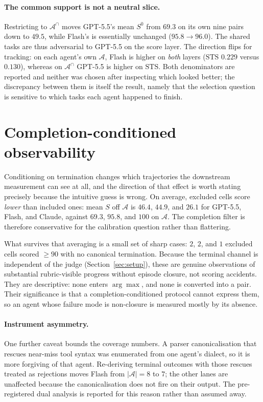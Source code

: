 \documentclass{article}
\newcommand{\A}{\mathcal{A}}
\newcommand{\Acap}{\mathcal{A}^{\cap}}
\newcommand{\STS}{\mathrm{STS}}
\begin{document}
\paragraph{The common support is not a neutral slice.}
Restricting to $\Acap$ moves GPT-5.5's mean $S^{0}$ from $69.3$ on its own nine pairs down to $49.5$, while Flash's is essentially unchanged ($95.8\to96.0$).
The shared tasks are thus adversarial to GPT-5.5 on the score layer.
The direction flips for tracking: on each agent's own $\A$, Flash is higher on \emph{both} layers ($\STS$ $0.229$ versus $0.130$), whereas on $\Acap$ GPT-5.5 is higher on $\STS$.
Both denominators are reported and neither was chosen after inspecting which looked better; the discrepancy between them is itself the result, namely that the selection question is sensitive to which tasks each agent happened to finish.

\section{Completion-conditioned observability}
\label{sec:completion}

Conditioning on termination changes which trajectories the downstream measurement can see at all, and the direction of that effect is worth stating precisely because the intuitive guess is wrong.
On average, excluded cells score \emph{lower} than included ones: mean $S$ off $\A$ is $46.4$, $44.9$, and $26.1$ for GPT-5.5, Flash, and Claude, against $69.3$, $95.8$, and $100$ on $\A$.
The completion filter is therefore conservative for the calibration question rather than flattering.

What survives that averaging is a small set of sharp cases: $2$, $2$, and $1$ excluded cells scored $\ge 90$ with no canonical termination.
Because the terminal channel is independent of the judge (Section~\ref{sec:setup}), these are genuine observations of substantial rubric-visible progress without episode closure, not scoring accidents.
They are descriptive: none enters $\arg\max$, and none is converted into a pair.
Their significance is that a completion-conditioned protocol cannot express them, so an agent whose failure mode is non-closure is measured mostly by its absence.

\paragraph{Instrument asymmetry.}
One further caveat bounds the coverage numbers.
A parser canonicalisation that rescues near-miss tool syntax was enumerated from one agent's dialect, so it is more forgiving of that agent.
Re-deriving terminal outcomes with those rescues treated as rejections moves Flash from $|\A|=8$ to $7$; the other lanes are unaffected because the canonicalisation does not fire on their output.
The pre-registered dual analysis is reported for this reason rather than assumed away.
\end{document}
